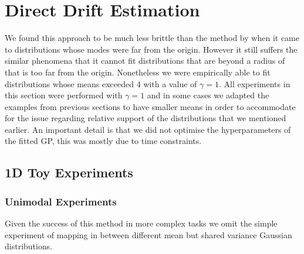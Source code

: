 \documentclass[a4paper,12pt,twoside,openright]{report}
\theoremstyle{definition}
\begin{document}
\section{Direct Drift Estimation}

We found this approach to be much less brittle than the method by \cite{pavon2018data} when it came to distributions whose modes were far from the origin. However it still suffers the similar phenomena that it cannot fit  distributions that are beyond a radius of that is too far from the origin. Nonetheless we were empirically able to fit distributions whose means exceeded 4 with a value of $\gamma=1$. All experiments in this section were performed with $\gamma=1$ and in some cases we adapted the examples from previous sections to have smaller means in order to accommodate for the issue regarding relative support of the distributions that we mentioned earlier. An important detail is that we did not optimise the hyperparameters of the fitted GP, this was mostly due to time constraints.

\subsection{1D Toy Experiments }
\subsubsection{Unimodal Experiments}
Given the success of this method in more complex tasks we omit the simple experiment of mapping in between different mean but shared variance Gaussian distributions.
\end{document}
